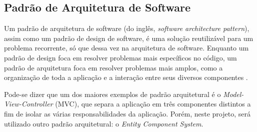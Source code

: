 \subsection{Padrão de Arquitetura de Software}

Um padrão de arquitetura de software (do inglês, \textit{software architecture pattern}), assim como um padrão de design de software, é uma solução reutilizável para um problema recorrente, só que dessa vez na arquitetura de software. Enquanto um padrão de design foca em resolver problemas mais específicos no código, um padrão de arquitetura foca em resolver problemas mais amplos, como a organização de toda a aplicação e a interação entre seus diversos componentes \cite{fundsoftwarearchitecture}.

Pode-se dizer que um dos maiores exemplos de padrão arquitetural é o \textit{Model-View-Controller} (MVC), que separa a aplicação em três componentes distintos a fim de isolar as várias responsabilidades da aplicação. Porém, neste projeto, será utilizado outro padrão arquitetural: o \textit{Entity Component System}.
